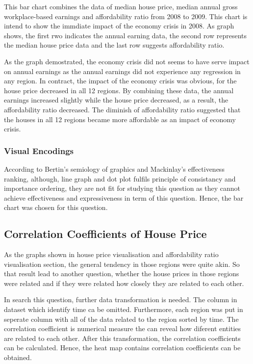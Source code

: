 \documentclass{article}
\begin{document}
This bar chart combines the data of median house price, median annual gross workplace-based earnings and 
affordability ratio from 2008 to 2009. This chart is intend to show the immdiate impact of the economy crisis 
in 2008. As graph shows, the first rwo indicates the annual earning data, the second row represents the median 
house price data and the last row suggests affordability ratio. 

As the graph demostrated, the economy crisis did not seems to have serve impact on annual earnings as the 
annual earnings did not experience any regression in any region. In contract, the impact of the economy crisis 
was obvious, for the house price decreased in all 12 regions. By combining these data, the annual earnings increased 
slightly while the house price decreased, as a result, the affordability ratio decreased. The diminish of 
affordability ratio suggested that the houses in all 12 regions became more affordable as an impact of 
economy crisis. 

\subsubsection{Visual Encodings}
According to Bertin's semiology of graphics and Mackinlay's effectiveness ranking, although, line graph and 
dot plot fulfils principle of consistancy and importance ordering, they are not fit for studying this question 
as they cannot achieve effectiveness and expressiveness in term of this question. Hence, the bar chart was 
chosen for this question.



\subsection{Correlation Coefficients of House Price}
As the graphs shown in house price visualisation and affordability ratio visualisation section, the general 
tendency in those regions were quite akin. So that result lead to another question, whether the house prices 
in those regions were related and if they were related how closely they are related to each other.

In search this question, further data transformation is needed. The column in dataset which identify time 
ca be omitted. Furthermore, each region was put in seperate column with all of the data related to the region 
sorted by time. The correlation coefficient is numerical measure the can reveal how diferent entities are 
related to each other. After this transformation, the correlation coefficients can be calculated. Hence, 
the heat map contains correlation coefficients can be obtained.
\end{document}
